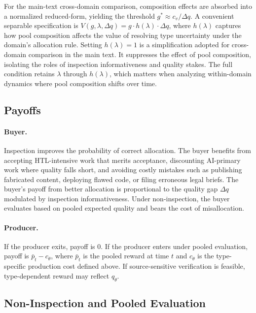 \documentclass{article}
\theoremstyle{plain}
\theoremstyle{definition}
\theoremstyle{remark}
\begin{document}
For the main-text cross-domain comparison, composition effects are absorbed into a normalized reduced-form, yielding the threshold $g^{\ast}\approx c_v/\Delta q$. A convenient separable specification is $V(g,\lambda,\Delta q)=g\cdot h(\lambda)\cdot\Delta q$, where $h(\lambda)$ captures how pool composition affects the value of resolving type uncertainty under the domain's allocation rule. Setting $h(\lambda)=1$ is a simplification adopted for cross-domain comparison in the main text. It suppresses the effect of pool composition, isolating the roles of inspection informativeness and quality stakes. The full condition retains $\lambda$ through $h(\lambda)$, which matters when analyzing within-domain dynamics where pool composition shifts over time.

\subsection{Payoffs}
\label{app:payoffs}

\paragraph{Buyer.}
Inspection improves the probability of correct allocation. The buyer benefits from accepting HTL-intensive work that merits acceptance, discounting AI-primary work where quality falls short, and avoiding costly mistakes such as publishing fabricated content, deploying flawed code, or filing erroneous legal briefs. The buyer's payoff from better allocation is proportional to the quality gap $\Delta q$ modulated by inspection informativeness. Under non-inspection, the buyer evaluates based on pooled expected quality and bears the cost of misallocation.

\paragraph{Producer.}
If the producer exits, payoff is $0$. If the producer enters under pooled evaluation, payoff is $\bar{p}_t - c_\theta$, where $\bar p_t$ is the pooled reward at time $t$ and $c_\theta$ is the type-specific production cost defined above. If source-sensitive verification is feasible, type-dependent reward may reflect $q_\theta$.

\subsection{Non-Inspection and Pooled Evaluation}
\label{app:pooled}
\end{document}
